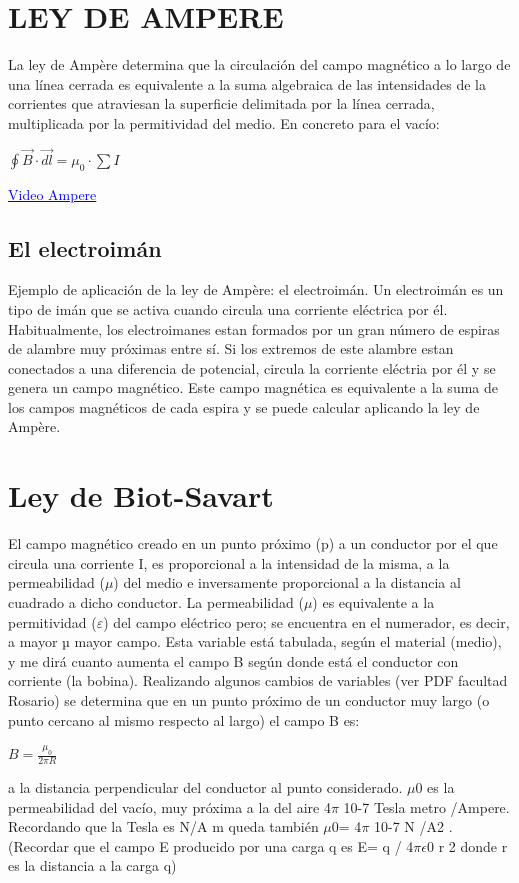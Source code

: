 \documentclass[10pt]{article}
\begin{document}
\begin{multicols}{2}
\section{LEY DE AMPERE}
La ley de Ampère determina que la circulación del campo magnético a lo largo de una línea cerrada es equivalente a la suma algebraica de las intensidades de la corrientes que atraviesan la superficie delimitada por la línea cerrada, multiplicada por la permitividad del medio. En concreto para el vacío:\\
\begin{center}
	$\oint \vec{B} \cdot \vec{dl} = \mu_{0} \cdot \sum I $ 
\end{center}

\href{https://www.youtube.com/watch?v=tqw9xw_20Qk}{\textcolor{blue}{Video Ampere}}
\subsection{El electroimán}
Ejemplo de aplicación de la ley de Ampère: el electroimán. Un electroimán es un tipo de imán que se activa cuando circula una corriente eléctrica por él. Habitualmente, los electroimanes estan formados por un gran número de espiras de alambre muy próximas entre sí.
Si los extremos de este alambre estan conectados a una diferencia de potencial, circula la corriente eléctria por él y se genera un campo magnético.
Este campo magnética es equivalente a la suma de los campos magnéticos de cada espira y se puede calcular aplicando la ley de Ampère.


\section{Ley de Biot-Savart}
El campo magnético creado en un punto próximo (p) a un conductor por el que circula una corriente
I, es proporcional a la intensidad de la misma, a la permeabilidad ($\mu$) del medio e inversamente
proporcional a la distancia al cuadrado a dicho conductor.
La permeabilidad ($\mu$) es equivalente a la permitividad ($\varepsilon $) del campo eléctrico pero; se encuentra
en el numerador, es decir, a mayor µ mayor campo. Esta variable está tabulada, según el material
(medio), y me dirá cuanto aumenta el campo B según donde está el conductor con corriente (la
bobina).
Realizando algunos cambios de variables (ver PDF facultad Rosario) se determina que en un punto
próximo de un conductor muy largo (o punto cercano al mismo respecto al largo) el campo B es:

\begin{center}
	$ B = \frac{\mu_{0}}{2\pi R} $
\end{center}
a la distancia perpendicular del conductor al punto considerado.
$\mu$0 es la permeabilidad del vacío, muy próxima a la del aire 4$\pi$ 10-7
Tesla metro /Ampere.
Recordando que la Tesla es N/A m queda también $\mu$0= 4$\pi$ 10-7 N /A2
.
(Recordar que el campo E producido por una carga q es E= q / 4$\pi \epsilon$0 r
2
donde r es la distancia a la
carga q)


\end{multicols}
\end{document}
